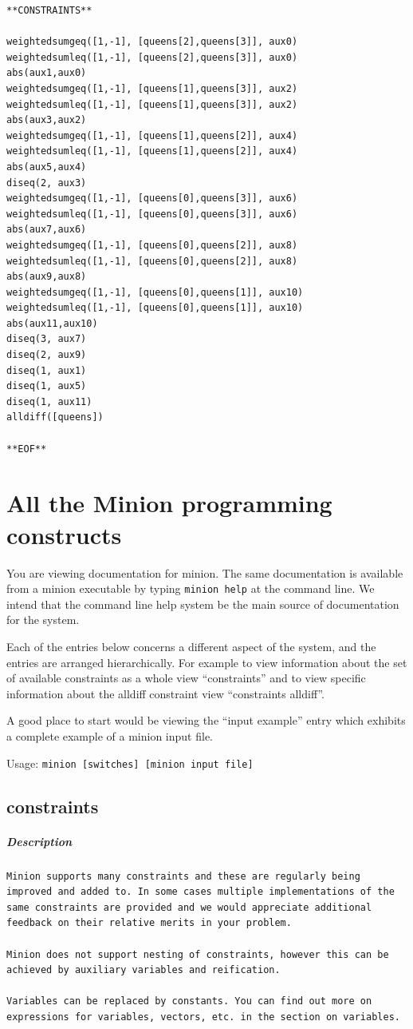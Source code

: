 \documentclass[oneside]{book}
\begin{document}
\begin{verbatim}
**CONSTRAINTS**

weightedsumgeq([1,-1], [queens[2],queens[3]], aux0)
weightedsumleq([1,-1], [queens[2],queens[3]], aux0)
abs(aux1,aux0)
weightedsumgeq([1,-1], [queens[1],queens[3]], aux2)
weightedsumleq([1,-1], [queens[1],queens[3]], aux2)
abs(aux3,aux2)
weightedsumgeq([1,-1], [queens[1],queens[2]], aux4)
weightedsumleq([1,-1], [queens[1],queens[2]], aux4)
abs(aux5,aux4)
diseq(2, aux3)
weightedsumgeq([1,-1], [queens[0],queens[3]], aux6)
weightedsumleq([1,-1], [queens[0],queens[3]], aux6)
abs(aux7,aux6)
weightedsumgeq([1,-1], [queens[0],queens[2]], aux8)
weightedsumleq([1,-1], [queens[0],queens[2]], aux8)
abs(aux9,aux8)
weightedsumgeq([1,-1], [queens[0],queens[1]], aux10)
weightedsumleq([1,-1], [queens[0],queens[1]], aux10)
abs(aux11,aux10)
diseq(3, aux7)
diseq(2, aux9)
diseq(1, aux1)
diseq(1, aux5)
diseq(1, aux11)
alldiff([queens])

**EOF**
\end{verbatim}

\appendix
\chapter{All the Minion programming constructs}
You are viewing documentation for minion. The same 
documentation is available from a minion executable by 
typing \texttt{minion help} at the command line.
We intend that the command line help system be the 
main source of documentation for the system.

Each of the entries below concerns a different aspect
of the system, and the entries are arranged hierarchically.
For example to view information about the set of available
constraints as a whole view ``constraints'' and to view
specific information about the alldiff constraint view 
``constraints alldiff''.

A good place to start would be viewing the 
``input example'' entry which exhibits a complete
example of a minion input file.

Usage: \texttt{minion [switches] [minion input file]}

\section{constraints}
\paragraph{Description}
{\footnotesize
\begin{verbatim}
Minion supports many constraints and these are regularly being
improved and added to. In some cases multiple implementations of the
same constraints are provided and we would appreciate additional
feedback on their relative merits in your problem.

Minion does not support nesting of constraints, however this can be
achieved by auxiliary variables and reification.

Variables can be replaced by constants. You can find out more on
expressions for variables, vectors, etc. in the section on variables.
\end{verbatim}
}
\end{document}
